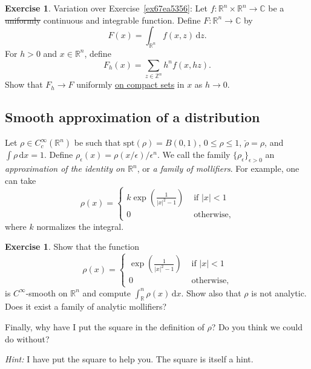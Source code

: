 \documentclass[a4paper,9pt]{amsart}
\newcommand{\Z}{\mathbb{Z}}	%
\newcommand{\R}{\mathbb{R}}	%
\newcommand{\C}{\mathbb{C}}	%
\newcommand{\did}{\,\mathrm{d}}	%
\newcommand{\spt}{\mathrm{spt}}
\theoremstyle{plain}
\theoremstyle{definition}
\newtheorem{exercise}[proposition]{Exercise}%
\theoremstyle{remark}
\begin{document}
\begin{exercise}\label{ex67f3a281}
	Variation over Exercise~\ref{ex67ea5356}: 
	Let $f:\R^n\times\R^n\to\C$ be a \sout{uniformly} continuous and integrable function.
	Define $F:\R^n\to\C$ by 
	\begin{equation}
		F(x) = \int_{\R^n} f(x,z) \did z .
	\end{equation}
	For $h>0$ and $x\in\R^n$, define
	\begin{equation}
		F_h(x) = \sum_{z\in\Z^n} h^n f(x,hz) .
	\end{equation}
	Show that $F_h\to F$ uniformly \underline{on compact sets} in $x$ as $h\to0$.
\end{exercise}



\subsection{Smooth approximation of a distribution}\label{subs67df2a23}

Let $\rho\in C^\infty_c(\R^n)$ be such that $\spt(\rho)=B(0,1)$, $0\le \rho\le 1$, $\check\rho=\rho$, and $\int\rho\did x = 1$.
Define $\rho_\epsilon(x) = \rho(x/\epsilon)/\epsilon^n$.
We call the family $\{\rho_\epsilon\}_{\epsilon>0}$ an \emph{approximation of the identity on $\R^n$}, or \emph{a family of mollifiers}.
For example, one can take
\begin{equation}
	\rho(x) = \begin{cases}
	k \exp\left(\frac{1}{|x|^2-1}\right) & \text{ if }|x|<1 \\
	0 & \text{ otherwise} ,
	\end{cases}
\end{equation}
where $k$ normalizes the integral.

\begin{exercise}
	Show that the function 
	\begin{equation}
		\rho(x) = \begin{cases}
		\exp\left(\frac{1}{|x|^2-1}\right) & \text{ if }|x|<1 \\
		0 & \text{ otherwise} ,
		\end{cases}
	\end{equation}
	is $C^\infty$-smooth on $\R^n$ and compute $\int_\R^n \rho(x)\did x$.
	Show also that $\rho$ is not analytic.
	Does it exist a family of analytic mollifiers?
	
	Finally, why have I put the square in the definition of $\rho$? Do you think we could do without?
	
	{\it Hint:} I have put the square to help you. The square is itself a hint.
\end{exercise}
\end{document}
